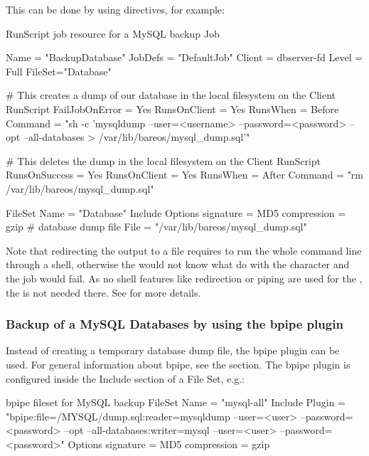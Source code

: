 This can be done by using  directives, for example:
\begin{bconfig}{RunScript job resource for a MySQL backup}
Job {
  Name = "BackupDatabase"
  JobDefs = "DefaultJob"
  Client = dbserver-fd
  Level = Full
  FileSet="Database"

  # This creates a dump of our database in the local filesystem on the Client
  RunScript {
    FailJobOnError = Yes
    RunsOnClient = Yes
    RunsWhen = Before
    Command = "sh -c 'mysqldump --user=<username> --password=<password> --opt --all-databases > /var/lib/bareos/mysql_dump.sql'"
  }

  # This deletes the dump in the local filesystem on the Client
  RunScript {
    RunsOnSuccess = Yes
    RunsOnClient = Yes
    RunsWhen = After
    Command = "rm /var/lib/bareos/mysql_dump.sql"
  }
}

FileSet {
  Name = "Database"
  Include {
    Options {
      signature = MD5
      compression = gzip
    }
  # database dump file
  File = "/var/lib/bareos/mysql_dump.sql" 
  }
}
\end{bconfig}

Note that redirecting the  output to a file requires
to run the whole command line through a shell, otherwise the 
would not know what do with the \command{>} character and the job would fail.
As no shell features like redirection or piping are used for the ,
the  is not needed there.
See  for more details.


\subsubsection{Backup of a MySQL Databases by using the bpipe plugin}

Instead of creating a temporary database dump file,
the bpipe plugin can be used. 
For general information about bpipe, see the  section. 
The bpipe plugin is configured inside the Include section of a File Set, e.g.:
\begin{bconfig}{bpipe fileset for MySQL backup}
FileSet {
  Name = "mysql-all"
  Include {
    Plugin = "bpipe:file=/MYSQL/dump.sql:reader=mysqldump --user=<user> --password=<password> --opt --all-databases:writer=mysql --user=<user> --password=<password>"
    Options {
      signature = MD5
      compression = gzip
    }
  }
}
\end{bconfig}

